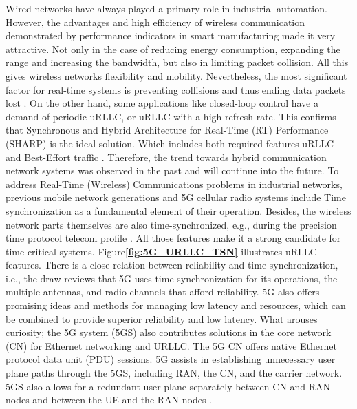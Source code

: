  Wired networks have always played a primary role in industrial automation. However, the advantages and high efficiency of wireless communication demonstrated by performance indicators in smart manufacturing made it very attractive. Not only in the case of reducing energy consumption, expanding the range and increasing the bandwidth, but also in limiting packet collision. All this gives wireless networks flexibility and mobility. Nevertheless, the most significant factor for real-time systems is preventing collisions and thus ending data packets lost \cite{ring2012wireless}.
On the other hand, some applications like closed-loop control have a demand of periodic uRLLC, or uRLLC with a high refresh rate. This confirms that Synchronous and Hybrid Architecture for Real-Time (RT) Performance (SHARP) is the ideal solution. Which includes both required features uRLLC and Best-Effort traffic \cite{Seijo2019}. Therefore, the trend towards hybrid communication network systems was observed in the past and will continue into the future.
To address Real-Time (Wireless) Communications problems in industrial networks, previous mobile network generations and 5G cellular radio systems include Time synchronization as a fundamental element of their operation. Besides, the wireless network parts themselves are also time-synchronized, e.g., during the precision time protocol telecom profile \cite{ITU_TG82751_study}. All those features make it a strong candidate for time-critical systems. Figure\textbf{\ref{fig:5G_URLLC_TSN}} illustrates uRLLC features. There is a close relation between reliability and time synchronization, i.e., the draw reviews that 5G uses time synchronization for its operations, the multiple antennas, and radio channels that afford reliability\cite{Ericsson2019}. 5G also offers promising ideas and methods for managing low latency and resources, which can be combined to provide superior reliability and low latency.
What arouses curiosity; the 5G system (5GS) also contributes solutions in the core network (CN) for Ethernet networking and URLLC. The 5G CN offers native Ethernet protocol data unit (PDU) sessions. 5G assists in establishing unnecessary user plane paths through the 5GS, including RAN, the CN, and the carrier network. 5GS also allows for a redundant user plane separately between CN and RAN nodes and between the UE and the RAN nodes  \cite{Mannweiler2020}.





